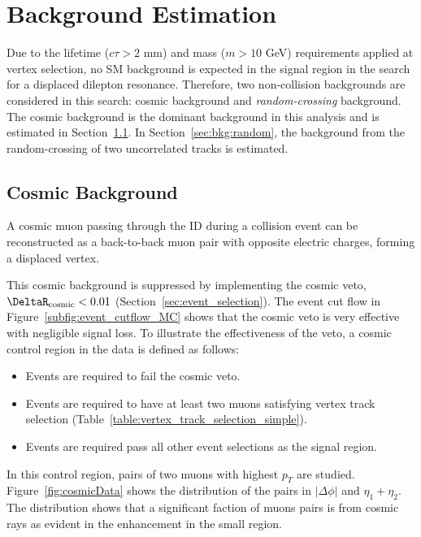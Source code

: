 \chapter{Background Estimation}
\label{chap:bkg}

Due to the lifetime ($c\tau > 2$ mm) and mass ($m > 10$ GeV) requirements applied at vertex selection, no SM background is expected in the signal region in the search for a displaced dilepton resonance. Therefore, two non-collision backgrounds are considered in this search: cosmic background and \textit{random-crossing} background. The cosmic background is the dominant background in this analysis and is estimated in Section~\ref{sec:bkg:cosmic}. In Section~\ref{sec:bkg:random}, the background from the random-crossing of two uncorrelated tracks is estimated.


\section{Cosmic Background}
\label{sec:bkg:cosmic}

A cosmic muon passing through the ID during a collision event can be reconstructed as a back-to-back muon pair with opposite electric charges, forming a displaced \mumu vertex.

This cosmic background is suppressed by implementing the cosmic veto, $\Rcr < 0.01$ (Section~\ref{sec:event_selection}). The event cut flow in Figure~\ref{subfig:event_cutflow_MC} shows that the cosmic veto is very effective with negligible signal loss. To illustrate the effectiveness of the veto, a cosmic control region in the data is defined as follows:

\begin{itemize}
  \item Events are required to fail the cosmic veto.
  \item Events are required to have at least two muons satisfying vertex track selection (Table~\ref{table:vertex_track_selection_simple}).
  \item Events are required pass all other event selections as the signal region.
\end{itemize}

In this control region, pairs of two muons with highest $p_{T}$ are studied. Figure~\ref{fig:cosmicData} shows the distribution of the pairs in $|\Delta\phi|$ and $\eta_{1}+\eta_{2}$. The distribution shows that a significant faction of muons pairs is from cosmic rays as evident in the enhancement in the small \Rcr region.

